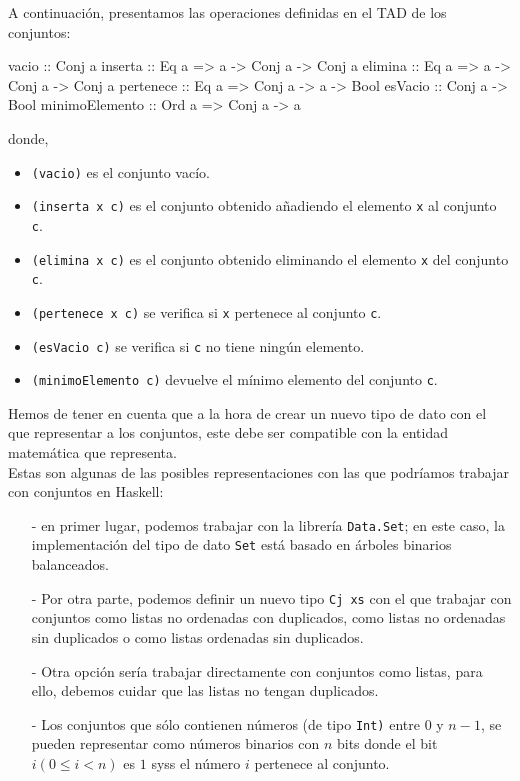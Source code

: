 A continuación, presentamos las operaciones definidas en el TAD de los 
conjuntos:

\begin{code}
vacio          :: Conj a                         
inserta        :: Eq a => a -> Conj a -> Conj a
elimina        :: Eq a => a -> Conj a -> Conj a
pertenece      :: Eq a => Conj a -> a -> Bool  
esVacio        :: Conj a -> Bool
minimoElemento :: Ord a => Conj a -> a
\end{code}

donde,

\begin{itemize}
\item \texttt{(vacio)} es el conjunto vacío.
\item \texttt{(inserta x c)} es el conjunto obtenido añadiendo el      
      elemento \texttt{x} al conjunto \texttt{c}.
\item \texttt{(elimina x c)} es el conjunto obtenido eliminando el
      elemento \texttt{x} del conjunto \texttt{c}.
\item \texttt{(pertenece x c)} se verifica si \texttt{x} pertenece al
      conjunto \texttt{c}.
\item \texttt{(esVacio c)} se verifica si \texttt{c} no tiene ningún
      elemento.
\item \texttt{(minimoElemento c)} devuelve el mínimo elemento del      
      conjunto \texttt{c}.\\
\end{itemize}


Hemos de tener en cuenta que a la hora de crear un nuevo tipo de dato 
con el que representar a los conjuntos, este debe ser compatible con 
la entidad matemática que representa.\\

Estas son algunas de las posibles representaciones con las que podríamos
trabajar con conjuntos en Haskell:

\begin{itemize}
  \item[-] en primer lugar, podemos trabajar con la librería  
        \texttt{Data.Set}; en este caso, la implementación del tipo de 
        dato \texttt{Set} está basado en árboles binarios balanceados.
  \item[-] Por otra parte, podemos definir un nuevo tipo \texttt{Cj xs} con  
        el que trabajar con conjuntos como listas no ordenadas con        
        duplicados, como listas no ordenadas sin duplicados o como        
        listas ordenadas sin duplicados.
  \item[-] Otra opción sería trabajar directamente con conjuntos como  
        listas, para ello, debemos cuidar que las listas no tengan        
        duplicados.
  \item[-] Los conjuntos que sólo contienen números (de tipo \texttt{Int)} 
        entre $0$ y $n-1$, se pueden representar como números binarios 
        con $n$ bits donde el bit $i (0 ≤ i < n)$ es $1$ syss el número
        $i$ pertenece al conjunto.
\end{itemize}

